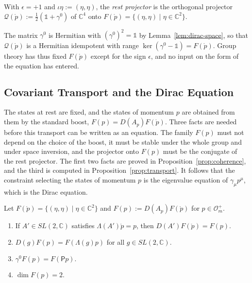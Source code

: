 \begin{definition}\label{def:rest-projector}
	With $\epsilon=+1$ and $\iota\eta:=(\eta,\eta)$, the \emph{rest projector} is the orthogonal projector $\mathcal{Q}(\mathring{p}):=\frac12(\mathbb{1}+\gamma^0)$ of $\mathbb{C}^4$ onto $F(\mathring{p})=\{(\eta,\eta)\mid\eta\in\mathbb{C}^2\}$.
\end{definition}

\noindent The matrix $\gamma^0$ is Hermitian with $(\gamma^0)^2=\mathbb{1}$ by Lemma~\ref{lem:dirac-space}, so that $\mathcal{Q}(\mathring{p})$ is a Hermitian idempotent with range $\ker(\gamma^0-\mathbb{1})=F(\mathring{p})$. Group theory has thus fixed $F(\mathring{p})$ except for the sign $\epsilon$, and no input on the form of the equation has entered.

\subsection{Covariant Transport and the Dirac Equation}\label{sec:transport}

The states at rest are fixed, and the states of momentum $p$ are obtained from them by the standard boost, $F(p)=D(A_p)F(\mathring{p})$. Three facts are needed before this transport can be written as an equation. The family $F(p)$ must not depend on the choice of the boost, it must be stable under the whole group and under space inversion, and the projector onto $F(p)$ must be the conjugate of the rest projector. The first two facts are proved in Proposition~\ref{prop:coherence}, and the third is computed in Proposition~\ref{prop:transport}. It follows that the constraint selecting the states of momentum $p$ is the eigenvalue equation of $\gamma_\mu p^\mu$, which is the Dirac equation.

\begin{proposition}\label{prop:coherence}
	Let $F(\mathring{p})=\{(\eta,\eta)\mid\eta\in\mathbb{C}^2\}$ and $F(p):=D(A_p)F(\mathring{p})$ for $p\in\mathcal{O}_m^+$.
	\begin{enumerate}
		\item If $A'\in SL(2,\mathbb{C})$ satisfies $\Lambda(A')\mathring{p}=p$, then $D(A')F(\mathring{p})=F(p)$.
		\item $D(g)F(p)=F(\Lambda(g)p)$ for all $g\in SL(2,\mathbb{C})$.
		\item $\gamma^0F(p)=F(\mathsf{P}p)$.
		\item $\dim F(p)=2$.
	\end{enumerate}
\end{proposition}

